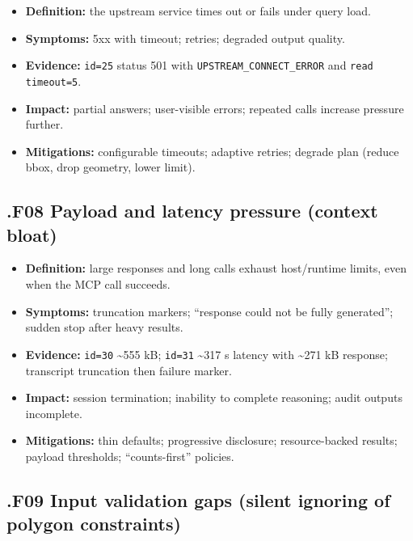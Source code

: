 \begin{itemize}[leftmargin=*]
\item \textbf{Definition:} the upstream service times out or fails under query load.
\item \textbf{Symptoms:} 5xx with timeout; retries; degraded output quality.
\item \textbf{Evidence:} \texttt{id=25} status 501 with \texttt{UPSTREAM\_CONNECT\_ERROR} and \texttt{read timeout=5}.
\item \textbf{Impact:} partial answers; user-visible errors; repeated calls increase pressure further.
\item \textbf{Mitigations:} configurable timeouts; adaptive retries; degrade plan (reduce bbox, drop geometry, lower limit).
\end{itemize}

\subsection*{.F08 Payload and latency pressure (context bloat)}

\begin{itemize}[leftmargin=*]
\item \textbf{Definition:} large responses and long calls exhaust host/runtime limits, even when the MCP call succeeds.
\item \textbf{Symptoms:} truncation markers; “response could not be fully generated”; sudden stop after heavy results.
\item \textbf{Evidence:} \texttt{id=30} \textasciitilde{}555 kB; \texttt{id=31} \textasciitilde{}317 s latency with \textasciitilde{}271 kB response; transcript truncation then failure marker.
\item \textbf{Impact:} session termination; inability to complete reasoning; audit outputs incomplete.
\item \textbf{Mitigations:} thin defaults; progressive disclosure; resource-backed results; payload thresholds; “counts-first” policies.
\end{itemize}

\subsection*{.F09 Input validation gaps (silent ignoring of polygon constraints)}


